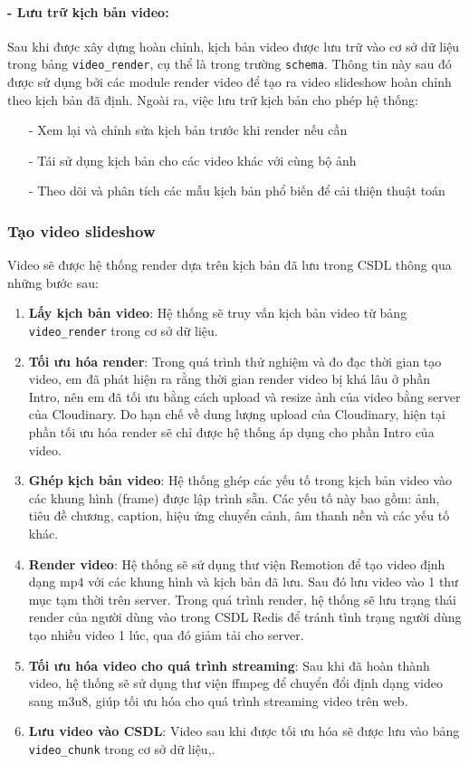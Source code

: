 \paragraph{- Lưu trữ kịch bản video:}
Sau khi được xây dựng hoàn chỉnh, kịch bản video được lưu trữ vào cơ sở dữ liệu trong bảng \texttt{video\_render}, cụ thể là trong trường \texttt{schema}. Thông tin này sau đó được sử dụng bởi các module render video để tạo ra video slideshow hoàn chỉnh theo kịch bản đã định. Ngoài ra, việc lưu trữ kịch bản cho phép hệ thống:
\begin{itemize}
    \item[-] Xem lại và chỉnh sửa kịch bản trước khi render nếu cần
    \item[-] Tái sử dụng kịch bản cho các video khác với cùng bộ ảnh
    \item[-] Theo dõi và phân tích các mẫu kịch bản phổ biến để cải thiện thuật toán
\end{itemize}

\subsubsection{Tạo video slideshow}
Video sẽ được hệ thống render dựa trên kịch bản đã lưu trong CSDL thông qua những bước sau:

\begin{enumerate}
    \item \textbf{Lấy kịch bản video}: Hệ thống sẽ truy vấn kịch bản video từ bảng \texttt{video\_render} trong cơ sở dữ liệu.
    \item \textbf{Tối ưu hóa render}: Trong quá trình thử nghiệm và đo đạc thời gian tạo video, em đã phát hiện ra rằng thời gian render video bị khá lâu ở phần Intro, nên em đã tối ưu bằng cách upload và resize ảnh của video bằng server của Cloudinary. Do hạn chế về dung lượng upload của Cloudinary, hiện tại phần tối ưu hóa render sẽ chỉ được hệ thống áp dụng cho phần Intro của video.
    \item \textbf{Ghép kịch bản video}: Hệ thống ghép các yếu tố trong kịch bản video vào các khung hình (frame) được lập trình sẵn. Các yếu tố này bao gồm: ảnh, tiêu đề chương, caption, hiệu ứng chuyển cảnh, âm thanh nền và các yếu tố khác.
    \item \textbf{Render video}: Hệ thống sẽ sử dụng thư viện Remotion để tạo video định dạng mp4 với các khung hình và kịch bản đã lưu. Sau đó lưu video vào 1 thư mục tạm thời trên server. Trong quá trình render, hệ thống sẽ lưu trạng thái render của người dùng vào trong CSDL Redis để tránh tình trạng người dùng tạo nhiều video 1 lúc, qua đó giảm tải cho server.
    \item \textbf{Tối ưu hóa video cho quá trình streaming}: Sau khi đã hoàn thành video, hệ thống sẽ sử dụng thư viện ffmpeg để chuyển đổi định dạng video sang m3u8, giúp tối ưu hóa cho quá trình streaming video trên web. 
    \item \textbf{Lưu video vào CSDL}: Video sau khi được tối ưu hóa sẽ được lưu vào bảng \texttt{video\_chunk} trong cơ sở dữ liệu,.
\end{enumerate}

